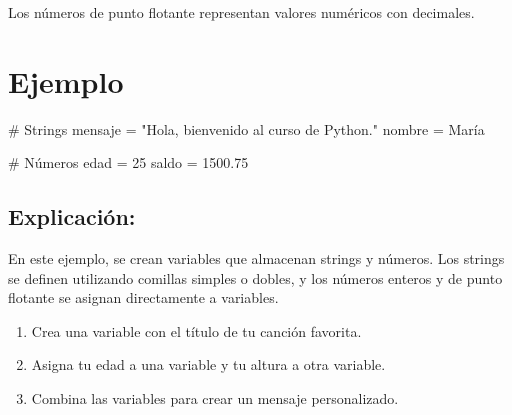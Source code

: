 \documentclass[
  a4paper,
  DIV=11,
  numbers=noendperiod,
  onepage,
  openany]{scrreprt}
\newenvironment{Shaded}{\begin{snugshade}}{\end{snugshade}}
\newcommand{\CommentTok}[1]{\textcolor[rgb]{0.37,0.37,0.37}{#1}}
\newcommand{\DecValTok}[1]{\textcolor[rgb]{0.68,0.00,0.00}{#1}}
\newcommand{\FloatTok}[1]{\textcolor[rgb]{0.68,0.00,0.00}{#1}}
\newcommand{\NormalTok}[1]{\textcolor[rgb]{0.00,0.23,0.31}{#1}}
\newcommand{\OperatorTok}[1]{\textcolor[rgb]{0.37,0.37,0.37}{#1}}
\newcommand{\StringTok}[1]{\textcolor[rgb]{0.13,0.47,0.30}{#1}}
\providecommand{\tightlist}{%
  \setlength{\itemsep}{0pt}\setlength{\parskip}{0pt}}\usepackage{longtable,booktabs,array}
\begin{document}
Los números de punto flotante representan valores numéricos con
decimales.

\section{Ejemplo}\label{ejemplo-3}

\begin{Shaded}
\begin{Highlighting}[]
\CommentTok{\# Strings}
\NormalTok{mensaje }\OperatorTok{=} \StringTok{"Hola, bienvenido al curso de Python."}
\NormalTok{nombre }\OperatorTok{=} \StringTok{\textquotesingle{}María\textquotesingle{}}

\CommentTok{\# Números}
\NormalTok{edad }\OperatorTok{=} \DecValTok{25}
\NormalTok{saldo }\OperatorTok{=} \FloatTok{1500.75}
\end{Highlighting}
\end{Shaded}

\subsection{Explicación:}\label{explicaciuxf3n-5}

En este ejemplo, se crean variables que almacenan strings y números. Los
strings se definen utilizando comillas simples o dobles, y los números
enteros y de punto flotante se asignan directamente a variables.

\begin{tcolorbox}[enhanced jigsaw, leftrule=.75mm, bottomtitle=1mm, title=\textcolor{quarto-callout-tip-color}{\faLightbulb}\hspace{0.5em}{Actividad Práctica}, colbacktitle=quarto-callout-tip-color!10!white, coltitle=black, bottomrule=.15mm, colframe=quarto-callout-tip-color-frame, titlerule=0mm, opacityback=0, rightrule=.15mm, toptitle=1mm, opacitybacktitle=0.6, arc=.35mm, breakable, colback=white, toprule=.15mm, left=2mm]

\begin{enumerate}
\def\labelenumi{\arabic{enumi}.}
\tightlist
\item
  Crea una variable con el título de tu canción favorita.
\item
  Asigna tu edad a una variable y tu altura a otra variable.
\item
  Combina las variables para crear un mensaje personalizado.
\end{enumerate}

\end{tcolorbox}
\end{document}
